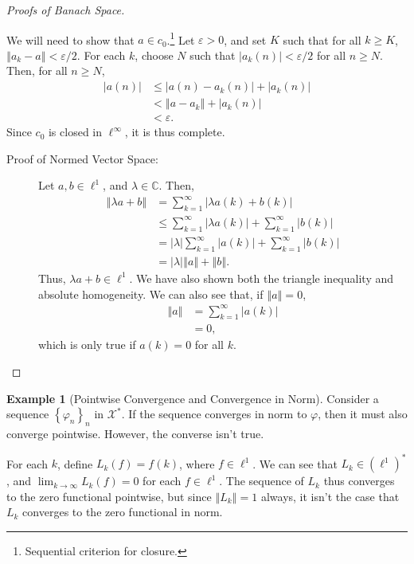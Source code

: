 \documentclass[12pt]{extarticle}
\newcommand{\C}{\mathbb{C}}
\newcommand{\norm}[1]{\left\Vert #1\right\Vert}
\newcommand{\set}[1]{\left\{#1\right\}}
\newcommand{\ve}{\varepsilon}
\theoremstyle{plain}
\theoremstyle{definition}
\newtheorem*{example}{Example}
\theoremstyle{note}
\renewcommand{\newline}{\hfill\break}
\begin{document}
\begin{proof}[Proofs of Banach Space]
\begin{description}[font = \normalfont]
\begin{description}
          We will need to show that $a\in c_0$.\footnote{Sequential criterion for closure.} Let $\ve > 0$, and set $K$ such that for all $k\geq K$, $\norm{a_k - a} < \ve/2$. For each $k$, choose $N$ such that $|a_k(n)| < \ve/2$ for all $n \geq N$. Then, for all $n\geq N$,
          \begin{align*}
            \left\vert a(n) \right\vert &\leq \left\vert a(n) - a_k(n) \right\vert + \left\vert a_k(n) \right\vert\\
                                        &< \norm{a - a_k} + \left\vert a_k(n) \right\vert\\
                                        &< \ve.
          \end{align*}
          Since $c_0$ is closed in $\ell^{\infty}$, it is thus complete.
      \end{description}
    \item[$\ell^{1}$:]\hfill
      \begin{description}
        \item[Proof of Normed Vector Space:] Let $a,b\in \ell^{1}$, and $\lambda \in \C$. Then,
          \begin{align*}
            \norm{\lambda a + b} &= \sum_{k=1}^{\infty}\left\vert \lambda a(k) + b(k) \right\vert\\
                                 &\leq \sum_{k=1}^{\infty}\left\vert \lambda a(k) \right\vert + \sum_{k=1}^{\infty}\left\vert b(k) \right\vert\\
                                 &= |\lambda|\sum_{k=1}^{\infty}\left\vert a(k) \right\vert + \sum_{k=1}^{\infty}\left\vert b(k) \right\vert\\
                                 &= |\lambda|\norm{a} + \norm{b}.
          \end{align*}
          Thus, $\lambda a + b\in \ell^{1}$. We have also shown both the triangle inequality and absolute homogeneity. We can also see that, if $\norm{a} = 0$,
          \begin{align*}
            \norm{a} &= \sum_{k=1}^{\infty}\left\vert a(k) \right\vert\\
            &= 0,
          \end{align*}
          which is only true if $a(k) = 0$ for all $k$.
      \end{description}
  \end{description}
\end{proof}
\begin{example}[Pointwise Convergence and Convergence in Norm]
  Consider a sequence $\set{\varphi_n}_n$ in $\mathcal{X}^{\ast}$. If the sequence converges in norm to $\varphi$, then it must also converge pointwise. However, the converse isn't true.\newline

  For each $k$, define $L_k(f) = f(k)$, where $f\in \ell^{1}$. We can see that $L_k \in \left(\ell^{1}\right)^{\ast}$, and $\lim_{k\rightarrow\infty}L_k(f) = 0$ for each $f\in \ell^{1}$. The sequence of $L_k$ thus converges to the zero functional pointwise, but since $\norm{L_k} = 1$ always, it isn't the case that $L_k$ converges to the zero functional in norm.
\end{example}
\end{document}
